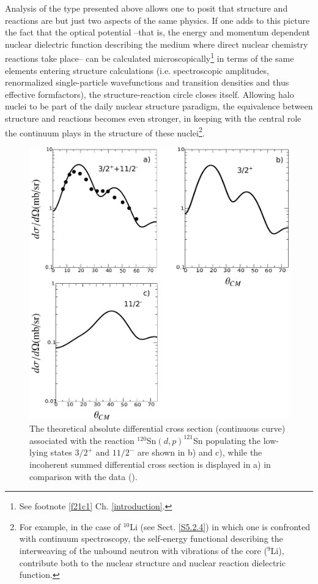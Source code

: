   
  Analysis of the type presented above allows one to posit that structure and reactions are but just two aspects of the same physics. If one adds to this picture the fact that the optical potential --that is, the energy and momentum dependent nuclear dielectric function describing the medium 	where direct nuclear chemistry reactions take place-- can be calculated microscopically\footnote{See footnote \ref{f21c1} Ch. \ref{introduction}.} in terms of the same elements entering structure calculations (i.e. spectroscopic amplitudes, renormalized single-particle wavefunctions and transition densities and thus effective formfactors), the structure-reaction circle closes itself.
  Allowing  halo nuclei to be part of the daily nuclear structure paradigm, the equivalence between structure and reactions becomes even stronger, in keeping with the central role the continuum plays in the structure of these nuclei\footnote{For example, in the case of $^{10}$Li (see Sect. \ref{S5.2.4}) in which one is confronted with continuum spectroscopy, the self-energy functional describing the interweaving of the unbound neutron with vibrations of the core ($^9$Li), contribute both to the nuclear structure and nuclear reaction dielectric function.}.
    \begin{figure}
    \centerline{\includegraphics*[width=\textwidth,angle=0]{C6/figs_C6/fig6_2_2.pdf}}
    \caption{  The theoretical absolute differential cross section (continuous curve) associated with the reaction $^{120}$Sn$(d,p)^{121}$Sn  populating the low-lying states $3/2^+$ and $11/2^-$ are shown in b) and c), while the incoherent summed differential cross section is displayed in a) in comparison with the data (\cite{Bechara:75}).}\label{fig6.2.2}
    \end{figure}
  

